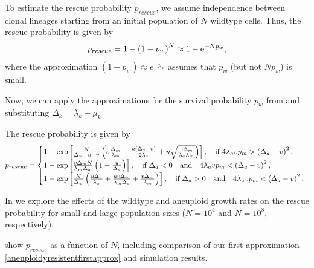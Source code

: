 \documentclass[12pt]{extarticle}
\newcommand{\e}{{\rm e}}
\begin{document}
To estimate the rescue probability $p_{rescue}$, we assume independence between clonal lineages starting from an initial population of $N$ wildtype cells.
Thus, the rescue probability is given by 
\begin{equation}
p_{rescue}=1-\left(1-p_w\right)^N\approx 1-\e^{-Np_w} ,
\end{equation}
where the approximation $(1-p_w)\approx e^{-p_w}$ assumes that $p_w$ (but not $N p_w$) is small.

Now, we can apply the approximations for the survival probability $p_w$ from  and substituting $\Delta_k=\lambda_k-\mu_k$ 


The rescue probability is given by
\begin{equation}\label{rescue_prob}
p_{rescue} = \left\{
  \begin{array}{@{}ll@{}}
  1-\exp\left[\frac{N}{\Delta_w-u-v}\left(v\frac{\Delta_m}{\lambda_m}+\frac{u\left(\Delta_a-v\right)}{2\lambda_a}+u\sqrt{\frac{v\Delta_m}{\lambda_a\lambda_m}}\right)\right],\quad\text{if }4\lambda_avp_m>\left(\Delta_a-v\right)^2,\\
   1-\exp\left[\frac{v\Delta_mN}{\lambda_m\Delta_w}\left(1-\frac{u}{\Delta_a}\right)\right],\quad\text{if }\Delta_a<0\quad\text{and}\quad4\lambda_avp_m<\left(\Delta_a-v\right)^2,\\
   1-\exp\left[\frac{N}{\Delta_w}\left(\frac{u\Delta_a}{\lambda_a}+\frac{uv\Delta_m}{\lambda_m\Delta_a}+\frac{v\Delta_m}{\lambda_m}\right)\right],\quad\text{if }\Delta_a>0\quad\text{and}\quad4\lambda_avp_m<\left(\Delta_a-v\right)^2.
  \end{array}\right.
\end{equation}


In  we explore the effects of the wildtype and aneuploid growth rates on the rescue probability for small and large population sizes ($N=10^4$ and $N=10^8$, respectively).

 show $p_{rescue}$ as a function of $N$, including comparison of our first approximation \eqref{aneuploidyresistentfirstapprox} and simulation results.
\end{document}
